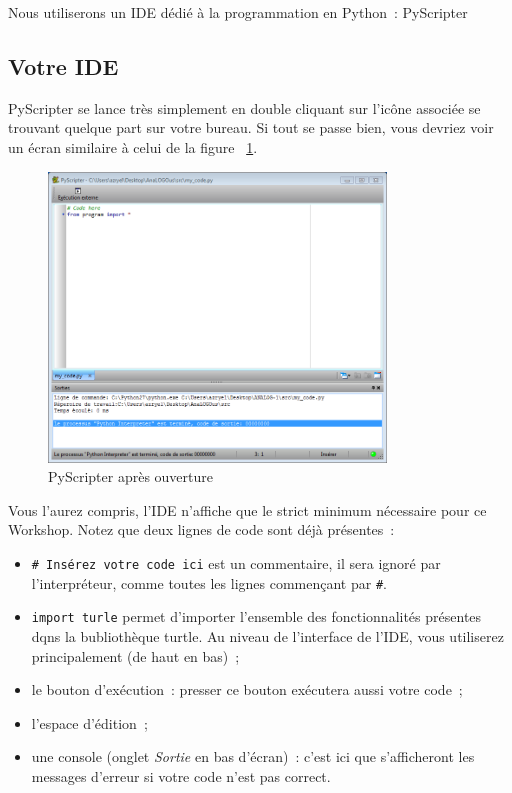 \documentclass[11pt,a4paper]{article}
\begin{document}
Nous utiliserons un IDE dédié à la programmation en Python~: PyScripter

\subsection{Votre IDE}

PyScripter se lance très simplement en double cliquant sur l'icône
associée se trouvant quelque part sur votre bureau. Si tout se passe
bien, vous devriez voir un écran similaire à celui de la figure~
\ref{fig:pyscripterstart}.

\begin{figure}
    \centering
    \includegraphics[width=0.8\textwidth]{img/capture}
    \caption{PyScripter après ouverture}
    \label{fig:pyscripterstart}
\end{figure}

Vous l'aurez compris, l'IDE n'affiche que le strict minimum nécessaire
pour ce Workshop. Notez que deux lignes de code sont déjà présentes~:

\begin{itemize}
    \item \lstinline{# Insérez votre code ici} est un commentaire, il sera ignoré par
        l'interpréteur, comme toutes les lignes commençant par \lstinline{#}.
    \item \lstinline{import turle} permet d'importer l'ensemble des fonctionnalités
        présentes dqns la bubliothèque turtle. Au niveau de l'interface de
        l'IDE, vous utiliserez principalement (de haut en bas)~;
    \item le bouton d'exécution~: presser ce bouton exécutera aussi votre code~;
    \item l'espace d'édition~;
    \item une console (onglet \emph{Sortie} en bas d'écran)~: c'est ici que
        s'afficheront les messages d'erreur si votre code n'est pas correct.
\end{itemize}
\end{document}
